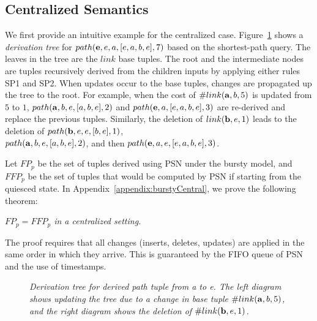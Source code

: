 \subsection{Centralized Semantics}

We first provide an intuitive example for the centralized
case. Figure~\ref{Derivation Tree} shows a {\em derivation tree} for $path({\bf
  e},e,a,[e,a,b,e],7)$ based on the shortest-path
  query. The leaves in
  the tree are the $link$ base tuples. The root and
  the intermediate nodes are tuples recursively derived from the
  children inputs by applying either rules SP1 and SP2. When
updates occur to the base tuples, changes are propagated up the tree to
the root. For example, when the cost of $\#link({\bf a},b,5)$ is updated from $5$ to $1$,
$path({\bf a},b,e,[a,b,e],2)$ and $path({\bf e},a,[e,a,b,e],3)$ are re-derived
and replace the previous tuples. Similarly, the deletion of $link({\bf
  b},e,1)$ leads to the deletion of $path({\bf b},e,e,[b,e],1)$,
\\$path({\bf a},b,e,[a,b,e],2)$, and then $path({\bf e},a,e,[e,a,b,e],3)$.

Let $FP_{p}$ be the set of tuples derived using PSN under the bursty model,
and $FFP_{p}$ be the set of tuples that would be computed by PSN if
starting from the quiesced state. In Appendix~\ref{appendix:burstyCentral}, we
prove the following theorem:

\vspace{1pt}
 {\em $FP_{p} = FFP_{p}$ in
  a centralized setting.}
\vspace{1pt}

The proof requires that all changes (inserts, deletes, updates) are applied in the same order
in which they arrive. This is guaranteed by the FIFO queue of PSN and
the use of timestamps.

\begin{figure}[ht]
\centering
{}
\caption{\label{Derivation Tree}\emph{\small Derivation tree for derived
    path tuple from a to e. The left diagram shows updating the tree due
    to a change in base tuple $\#link({\bf a},b,5)$, and the right diagram shows
    the deletion of $\#link({\bf b},e,1)$.}}
\end{figure}                                              


